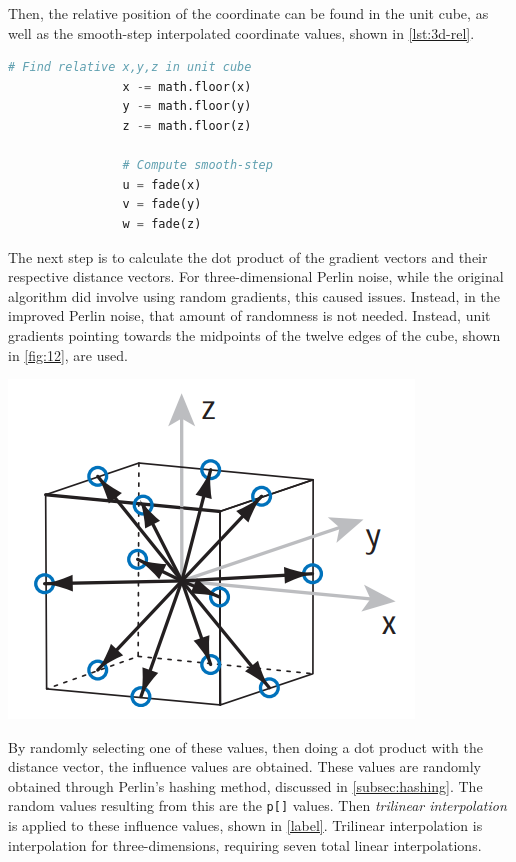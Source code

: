 \documentclass[10pt]{report}
\begin{document}
			Then, the relative position of the coordinate can be found in the unit cube, as well as the smooth-step interpolated coordinate values, shown in \autoref{lst:3d-rel}. 
			
			\begin{lstlisting}[label={lst:3d-rel}, language=Python, frame=none, caption={Relative position calculation of x,y,z coordinates as well as smooth-step interpolation}, captionpos=b]
				# Find relative x,y,z in unit cube
				x -= math.floor(x)
				y -= math.floor(y)
				z -= math.floor(z)
				
				# Compute smooth-step 
				u = fade(x)
				v = fade(y)
				w = fade(z)
			\end{lstlisting}
		
			The next step is to calculate the dot product of the gradient vectors and their respective distance vectors. For three-dimensional Perlin noise, while the original algorithm did involve using random gradients, this caused issues. Instead, in the improved Perlin noise, that amount of randomness is not needed. Instead, unit gradients pointing towards the midpoints of the twelve edges of the cube, shown in \autoref{fig:12}, are used. 
			
			\begin{minipage}{\textwidth}
				\centering
				\includegraphics[scale=0.5]{12}
				\label{fig:12}
			\end{minipage}
			
			By randomly selecting one of these values, then doing a dot product with the distance vector, the influence values are obtained. These values are randomly obtained through Perlin's hashing method, discussed in \autoref{subsec:hashing}. The random values resulting from this are the \lstinline|p[]| values. Then \emph{trilinear interpolation} is applied to these influence values, shown in \autoref{label}. Trilinear interpolation is interpolation for three-dimensions, requiring seven total linear interpolations.
			
\end{document}
